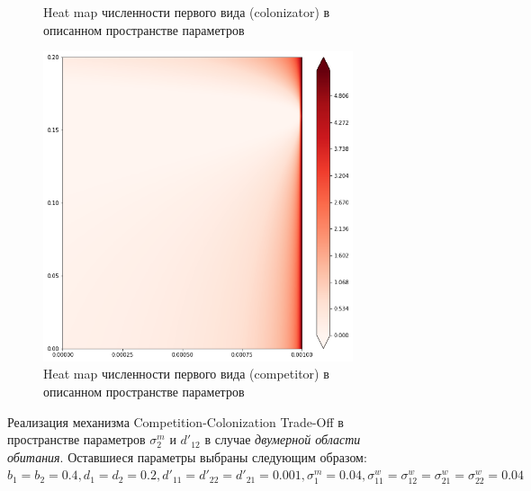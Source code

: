 \begin{figure}
\begin{subfigure}{.5\textwidth}
		\caption{Heat map численности первого вида (colonizator) в описанном пространстве параметров}
		\label{fig:cctod2:sub3}
	\end{subfigure}%
	\begin{subfigure}{.5\textwidth}
		\centering
		\includegraphics[width=.95\linewidth]{ccto_d2_n2.png}
		\caption{Heat map численности первого вида (competitor) в описанном пространстве параметров}
		\label{fig:cctod2:sub4}
	\end{subfigure}
	\caption{Реализация механизма Competition-Colonization Trade-Off  в пространстве параметров  $\sigma^m_2$ и $d'_{12}$ в случае  \emph{двумерной области обитания}. Оставшиеся параметры выбраны следующим образом:  $b_{1}=b_{2}=0.4
		, d_{1}=d_{2}=0.2
		, d'_{11}=d'_{22}=d'_{21}=0.001,
		\sigma_{1}^{m}=0.04
		, \sigma_{11}^{w}=\sigma_{12}^{w}=\sigma_{21}^{w}=\sigma_{22}^{w}=0.04$}
	\label{fig:cctod2}
\end{figure}


